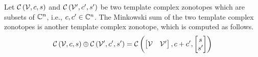 %
\begin{proposition}
Let $\mathit{\mathcal{C}}\left(\mathcal{V},c,s\right)$ and
$\mathit{\mathcal{C}}\left(\mathcal{V}^\prime,c^\prime,s^\prime\right)$ be two template complex
zonotopes which are subsets of $\mathbb{C}^n$, i.e.,
$c,c^\prime\in\mathbb{C}^n$.  The Minkowski sum of the two
template complex zonotopes is another template complex zonotope,
which is computed as follows.
%
\begin{equation}
\mathit{\mathcal{C}}\left(\mathcal{V},c,s\right)\oplus \mathit{\mathcal{C}}\left(\mathcal{V}^\prime,c^\prime,s^\prime\right)
= \mathit{\mathcal{C}}\left(\begin{bmatrix}\mathcal{V} & \mathcal{V}^\prime\end{bmatrix},c+c^\prime,\begin{bmatrix}s\\s^\prime\end{bmatrix}\right)
\end{equation}
\end{proposition}
%
